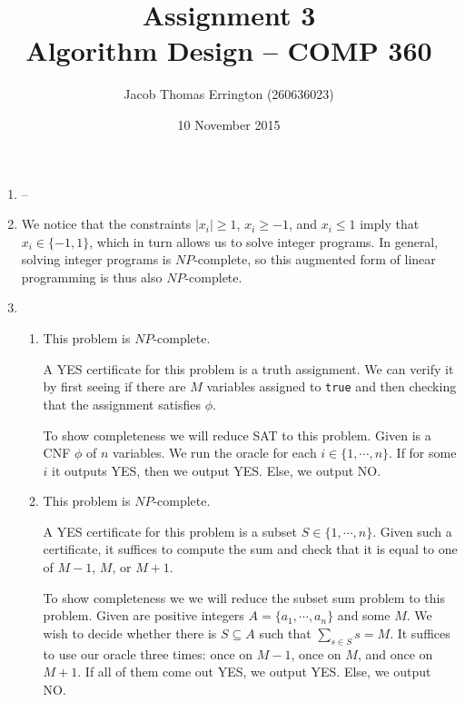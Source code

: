 \documentclass[letterpaper,11pt]{article}
\author{Jacob Thomas Errington (260636023)}
\title{Assignment 3\\Algorithm Design -- COMP 360}
\date{10 November 2015}
\begin{document}
\maketitle

\begin{enumerate}
    \item
        --

    \item
        We notice that the constraints $|x_i| \geq 1$, $x_i \geq -1$, and
        $x_i \leq 1$ imply that $x_i \in \{-1, 1\}$, which in turn allows us to
        solve integer programs. In general, solving integer programs is
        $NP$-complete, so this augmented form of linear programming is thus
        also $NP$-complete.

    \item
        \begin{enumerate}
            \item
                This problem is $NP$-complete.

                A YES certificate for this problem is a truth assignment. We
                can verify it by first seeing if there are $M$ variables
                assigned to \texttt{true} and then checking that the assignment
                satisfies $\phi$.

                To show completeness we will reduce SAT to this problem. Given
                is a CNF $\phi$ of $n$ variables. We run the oracle for each 
                $i \in \{1, \cdots, n\}$. If for some $i$ it outputs YES, then
                we output YES. Else, we output NO.

            \item
                This problem is $NP$-complete.

                A YES certificate for this problem is a subset
                $S \in \{1, \cdots, n\}$. Given such a certificate, it suffices
                to compute the sum and check that it is equal to one of 
                $M - 1$, $M$, or $M + 1$.

                To show completeness we we will reduce the subset sum problem
                to this problem. Given are positive integers
                $A = \{a_1, \cdots, a_n\}$ and some $M$. We wish to decide
                whether there is $S \subseteq A$ such that
                $\sum_{s \in S} s = M$. It suffices to use our oracle three
                times: once on $M-1$, once on $M$, and once on $M+1$.
                If all of them come out YES, we output YES. Else, we
                output NO.


\end{enumerate}
\end{enumerate}
\end{document}

